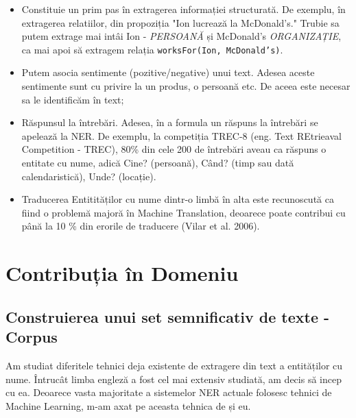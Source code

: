 \begin{itemize}
\item Constituie un prim pas în extragerea informației structurată. De exemplu, în extragerea relatiilor, din propoziția "Ion lucrează la McDonald's." Trubie sa putem extrage mai intâi Ion - \textit{PERSOANĂ} și McDonald's \textit{ORGANIZAȚIE}, ca mai apoi să extragem relația \texttt{worksFor(Ion, McDonald's)}.
\item Putem asocia sentimente (pozitive/negative) unui text. Adesea aceste sentimente sunt cu privire la un produs, o persoană etc. De aceea este necesar sa le identificăm în text;
\item Răspunsul la întrebări. Adesea, în a formula un răspuns la întrebări se apelează la NER. De exemplu, la competiția TREC-8 (eng. Text REtrieaval Competition - TREC), 80\% din cele 200 de întrebări aveau ca răspuns o entitate cu nume, adică Cine? (persoană), Când? (timp sau dată calendaristică), Unde? (locație).\cite{trec8}
\item Traducerea Entitităților cu nume dintr-o limbă în alta este recunoscută ca fiind o problemă majoră în Machine Translation, deoarece poate contribui cu până la 10 \% din erorile de traducere (Vilar et al. 2006).\cite{vilar2006}
\end{itemize}

\section{Contribuția în Domeniu}

\subsection{Construierea unui set semnificativ de texte - Corpus}
Am studiat diferitele tehnici deja existente de extragere din text a entităților cu nume. Întrucât limba engleză a fost cel mai extensiv studiată, am decis să incep cu ea. Deoarece vasta majoritate a sistemelor NER actuale folosesc tehnici de Machine Learning, m-am axat pe aceasta tehnica de și eu.


